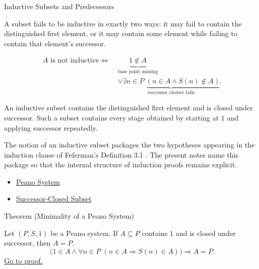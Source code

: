 \begin{topicbox}{Inductive Subsets and Predecessors}
\begin{remark*}
A subset fails to be inductive in exactly two ways: it may fail to contain the
distinguished first element, or it may contain some element while failing to
contain that element's successor.
\end{remark*}

\begin{remark*}
\[
\begin{aligned}
A \text{ is not inductive}
\Longleftrightarrow\;&
\underbrace{1 \notin A}_{\text{base point missing}}\\
&\lor
\underbrace{\exists n \in P\;(n \in A \land S(n) \notin A)}_{\text{successor closure fails}}.
\end{aligned}
\]
\end{remark*}

\begin{remark*}[Interpretation]
An inductive subset contains the distinguished first element and is closed
under successor. Such a subset contains every stage obtained by starting at
$1$ and applying successor repeatedly.
\end{remark*}

\begin{remark*}
The notion of an inductive subset packages the two hypotheses appearing in the
induction clause of Feferman's Definition 3.1
\citep{FefermanNumberSystems1964}. The present notes name this package so
that the internal structure of induction proofs remains explicit.
\end{remark*}

\begin{dependencies}
\begin{itemize}
  \item \hyperref[def:peano-system]{Peano System}
  \item \hyperref[def:successor-closed-subset]{Successor-Closed Subset}
\end{itemize}
\end{dependencies}

\begin{theorembox}{Theorem (Minimality of a Peano System)}
\begin{theorem}
\label{thm:peano-minimality}
Let $(P,S,1)$ be a Peano system. If $A\subseteq P$ contains $1$ and is closed
under successor, then $A=P$.
\[
\bigl(1\in A \land
\forall n\in P\;(n\in A \Longrightarrow S(n)\in A)\bigr)
\Longrightarrow A=P.
\]
\hyperref[prf:peano-minimality]{Go to proof.}
\end{theorem}
\end{theorembox}


\end{topicbox}

